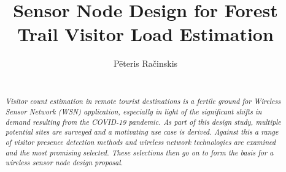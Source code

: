 \documentclass[10pt,nocopyrightspace]{ewsn-proc}
\author{
\alignauthor Pēteris Račinskis \\
    \affaddr{University of Latvia}\\
    \email{pr13001@edu.lu.lv}
}
\title{Sensor Node Design for Forest Trail Visitor Load Estimation}
\begin{document}
\maketitle

\begin{abstract}
\textit{Visitor count estimation in remote tourist destinations is a fertile ground for Wireless Sensor Network (WSN) application, especially in light of the significant shifts in demand resulting from the COVID-19 pandemic. As part of this design study, multiple potential sites are surveyed and a motivating use case is derived. Against this a range of visitor presence detection methods and wireless network technologies are examined and the most promising selected. These selections then go on to form the basis for a wireless sensor node design proposal.}  
\end{abstract}

%
%

%
\end{document}
